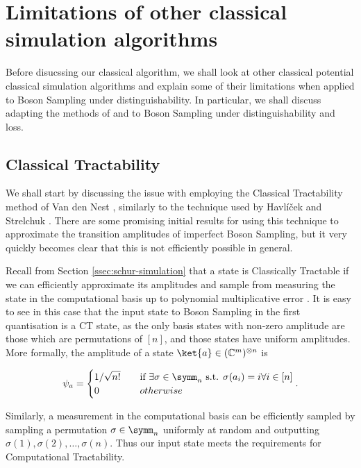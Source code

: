 \section{Limitations of other classical simulation algorithms}

Before disucssing our classical algorithm, we shall look at other classical potential classical simulation algorithms and explain some of their limitations when applied to Boson Sampling under distinguishability. In particular, we shall discuss adapting the methods of \cite{havlicek2018, havlicek2019} and \cite{oszmaniec2018} to Boson Sampling under distinguishability and loss.

\subsection{Classical Tractability}

We shall start by discussing the issue with employing the Classical Tractability method of Van den Nest \cite{vandennest2011}, similarly to the technique used by Havl\'{i}\v{c}ek and Strelchuk \cite{havlicek2018}. There are some promising initial results for using this technique to approximate the transition amplitudes of imperfect Boson Sampling, but it very quickly becomes clear that this is not efficiently possible in general.

Recall from Section \ref{ssec:schur-simulation} that a state is Classically Tractable if we can efficiently approximate its amplitudes and sample from measuring the state in the computational basis up to polynomial multiplicative error \cite{vandennest2011}. It is easy to see in this case that the input state to Boson Sampling in the first quantisation is a CT state, as the only basis states with non-zero amplitude are those which are permutations of $[n]$, and those states have uniform amplitudes. More formally, the amplitude of a state $\ket{a}\in(\mathbb{C}^m)^{\otimes n}$ is

\begin{equation}
\psi_a = \begin{cases}1/\sqrt{n!} & \quad \textrm{if } \exists \sigma\in\symm_n \textrm{ s.t. } \sigma(a_i) = i \forall i\in[n]\\0 & \quad{otherwise}\end{cases}.
\end{equation}

Similarly, a measurement in the computational basis can be efficiently sampled by sampling a permutation $\sigma \in \symm_n$ uniformly at random and outputting $\sigma(1), \sigma(2),\dots,\sigma(n)$. Thus our input state meets the requirements for Computational Tractability.

